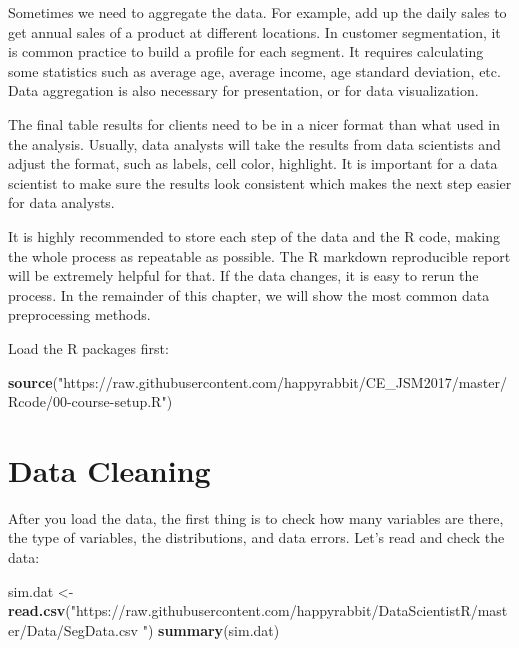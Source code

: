 \documentclass[12pt,]{krantz}
\newenvironment{Shaded}{\begin{snugshade}}{\end{snugshade}}
\newcommand{\KeywordTok}[1]{\textcolor[rgb]{0.13,0.29,0.53}{\textbf{{#1}}}}
\newcommand{\StringTok}[1]{\textcolor[rgb]{0.31,0.60,0.02}{{#1}}}
\newcommand{\NormalTok}[1]{{#1}}
\theoremstyle{definition}
\theoremstyle{definition}
\theoremstyle{remark}
\begin{document}
Sometimes we need to aggregate the data. For example, add up the daily
sales to get annual sales of a product at different locations. In
customer segmentation, it is common practice to build a profile for each
segment. It requires calculating some statistics such as average age,
average income, age standard deviation, etc. Data aggregation is also
necessary for presentation, or for data visualization.

The final table results for clients need to be in a nicer format than
what used in the analysis. Usually, data analysts will take the results
from data scientists and adjust the format, such as labels, cell color,
highlight. It is important for a data scientist to make sure the results
look consistent which makes the next step easier for data analysts.

It is highly recommended to store each step of the data and the R code,
making the whole process as repeatable as possible. The R markdown
reproducible report will be extremely helpful for that. If the data
changes, it is easy to rerun the process. In the remainder of this
chapter, we will show the most common data preprocessing methods.

Load the R packages first:

\begin{Shaded}
\begin{Highlighting}[]
\KeywordTok{source}\NormalTok{(}\StringTok{"https://raw.githubusercontent.com/happyrabbit/CE_JSM2017/master/Rcode/00-course-setup.R"}\NormalTok{)}
\end{Highlighting}
\end{Shaded}

\section{Data Cleaning}\label{data-cleaning}

After you load the data, the first thing is to check how many variables
are there, the type of variables, the distributions, and data errors.
Let's read and check the data:

\begin{Shaded}
\begin{Highlighting}[]
\NormalTok{sim.dat <-}\StringTok{ }\KeywordTok{read.csv}\NormalTok{(}\StringTok{"https://raw.githubusercontent.com/happyrabbit/DataScientistR/master/Data/SegData.csv "}\NormalTok{)}
\KeywordTok{summary}\NormalTok{(sim.dat)}
\end{Highlighting}
\end{Shaded}
\end{document}
